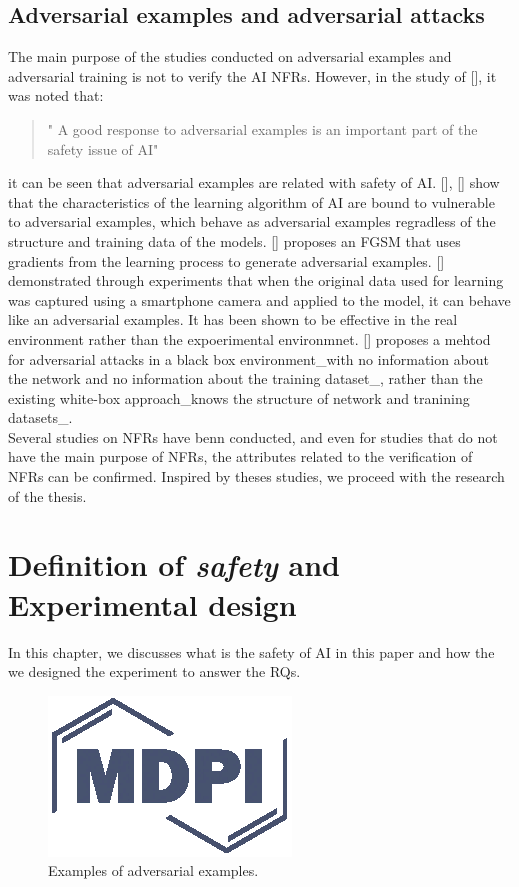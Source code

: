 \documentclass[journal,article,submit,moreauthors,pdftex]{Definitions/mdpi}
\begin{document}
\subsection{Adversarial examples and adversarial attacks}

The main purpose of the studies conducted on adversarial examples and adversarial training is not to verify the AI NFRs.
However, in the study of [], it was noted that:
\begin{quote}
   " A good response to adversarial examples is an important part of the safety issue of AI"
\end{quote}
it can be seen that adversarial examples are related with safety of AI.
[], [] show that the characteristics of the learning algorithm of AI are bound to vulnerable to adversarial examples, which behave as adversarial examples regradless of the structure and training data of the models.
[] proposes an FGSM that uses gradients from the learning process to generate adversarial examples.
[] demonstrated through experiments that when the original data used for learning was captured using a smartphone camera and applied to the model, it can behave like an adversarial examples. It has been shown to be effective in the real environment rather than the expoerimental environmnet.
[] proposes a mehtod for adversarial attacks in a black box environment\_with no information about the network and no information about the training dataset\_, rather than the existing white-box approach\_knows the structure of network and tranining datasets\_. \\

Several studies on NFRs have benn conducted, and even for studies that do not have the main purpose of NFRs, the attributes related to the verification of NFRs can be confirmed.
Inspired by theses studies, we proceed with the research of the thesis.

\section{Definition of {\it safety} and Experimental design}

In this chapter, we discusses what is the safety of AI in this paper and how the we designed the experiment to answer the RQs.

\begin{figure}[H] %
\includegraphics[width=5 cm]{Definitions/logo-mdpi}
\caption{Examples of adversarial examples.\label{fig1}}
\end{figure}   
\end{document}

